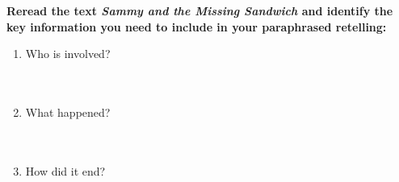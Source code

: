 \documentclass[12pt]{article}
\begin{document}
\begin{tcolorbox}[colframe=black!60, colback=white, 
coltitle=black, colbacktitle=black!15, fonttitle=\bfseries\Large, 
title=Guided Practice, halign title=center, left=10pt, right=10pt, top=10pt, bottom=15pt]
\textbf{Reread the text \textit{Sammy and the Missing Sandwich} and identify the key information you need to include in your paraphrased retelling:}
\begin{enumerate}[itemsep=3em] %
    \item Who is involved?
\\[0.8cm] \underline{\hspace{15cm}}  
    \\[0.8cm] \underline{\hspace{15cm}}  
    \\[0.8cm] \underline{\hspace{15cm}} 
    \item What happened?
\\[0.8cm] \underline{\hspace{15cm}}  
    \\[0.8cm] \underline{\hspace{15cm}}  
    \\[0.8cm] \underline{\hspace{15cm}} 
    \item How did it end?
\\[0.8cm] \underline{\hspace{15cm}}  
    \\[0.8cm] \underline{\hspace{15cm}}  
    \\[0.8cm] \underline{\hspace{15cm}} 

\vspace{1.5em}\end{enumerate}
\end{tcolorbox}
\vspace{2em}
\end{document}
